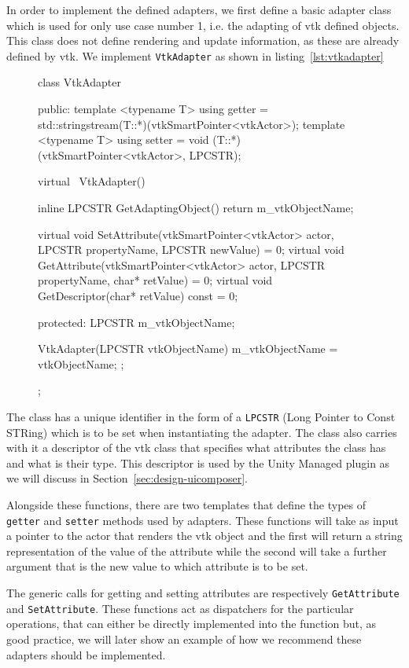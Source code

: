 In order to implement the defined adapters, we first define a basic adapter class which is used for only use case number 1, i.e. the adapting of \acrshort{vtk} defined objects. This class does not define rendering and update information, as these are already defined by \acrshort{vtk}. We implement \verb|VtkAdapter| as shown in listing~\ref{lst:vtkadapter}

\begin{figure}
    \centering
    \begin{cpp}[label=lst:vtkadapter,caption={vtkAdapter class}]
class VtkAdapter
{
public:
	template <typename T> using getter = std::stringstream(T::*)(vtkSmartPointer<vtkActor>);
	template <typename T> using setter = void (T::*)(vtkSmartPointer<vtkActor>, LPCSTR);

	virtual ~VtkAdapter() { }

	inline LPCSTR GetAdaptingObject() {
		return m_vtkObjectName;
	}

	virtual void SetAttribute(vtkSmartPointer<vtkActor> actor, LPCSTR propertyName, LPCSTR newValue) = 0;
	virtual void GetAttribute(vtkSmartPointer<vtkActor> actor, LPCSTR propertyName, char* retValue) = 0;
	virtual void GetDescriptor(char* retValue) const = 0;

protected:
	LPCSTR m_vtkObjectName;

	VtkAdapter(LPCSTR vtkObjectName) { 
		m_vtkObjectName = vtkObjectName;
	};
};
    \end{cpp}
\end{figure}

The class has a unique identifier in the form of a \verb|LPCSTR| (Long Pointer to Const STRing) which is to be set when instantiating the adapter. The class also carries with it a descriptor of the \acrshort{vtk} class that specifies what attributes the class has and what is their type. This descriptor is used by the Unity Managed plugin as we will discuss in Section~\ref{sec:design-uicomposer}.

Alongside these functions, there are two templates that define the types of \verb|getter| and \verb|setter| methods used by adapters. These functions will take as input a pointer to the actor that renders the \acrshort{vtk} object and the first will return a string representation of the value of the attribute while the second will take a further argument that is the new value to which attribute is to be set.

The generic calls for getting and setting attributes are respectively \verb|GetAttribute| and \verb|SetAttribute|. These functions act as dispatchers for the particular operations, that can either be directly implemented into the function but, as good practice, we will later show an example of how we recommend these adapters should be implemented.

